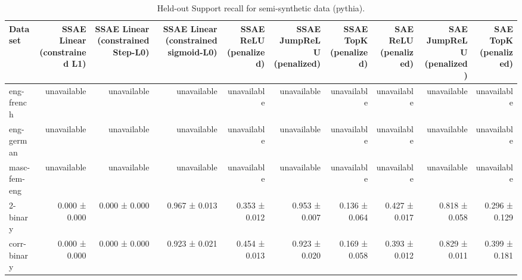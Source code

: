 \begin{table}[t]
\centering
\caption{Held-out Support recall for semi-synthetic data (pythia).}
\label{tab:semisynthetic-pythia-support-recall}
\begin{tabular}{lrrrrrrrrr}
\toprule
Dataset & SSAE Linear (constrained L1) & SSAE Linear (constrained Step-L0) & SSAE Linear (constrained sigmoid-L0) & SSAE ReLU (penalized) & SSAE JumpReLU (penalized) & SSAE TopK (penalized) & SAE ReLU (penalized) & SAE JumpReLU (penalized) & SAE TopK (penalized) \\
\midrule
eng-french & unavailable & unavailable & unavailable & unavailable & unavailable & unavailable & unavailable & unavailable & unavailable \\
eng-german & unavailable & unavailable & unavailable & unavailable & unavailable & unavailable & unavailable & unavailable & unavailable \\
masc-fem-eng & unavailable & unavailable & unavailable & unavailable & unavailable & unavailable & unavailable & unavailable & unavailable \\
2-binary & 0.000 ± 0.000 & 0.000 ± 0.000 & 0.967 ± 0.013 & 0.353 ± 0.012 & 0.953 ± 0.007 & 0.136 ± 0.064 & 0.427 ± 0.017 & 0.818 ± 0.058 & 0.296 ± 0.129 \\
corr-binary & 0.000 ± 0.000 & 0.000 ± 0.000 & 0.923 ± 0.021 & 0.454 ± 0.013 & 0.923 ± 0.020 & 0.169 ± 0.058 & 0.393 ± 0.012 & 0.829 ± 0.011 & 0.399 ± 0.181 \\
\bottomrule
\end{tabular}
\end{table}
